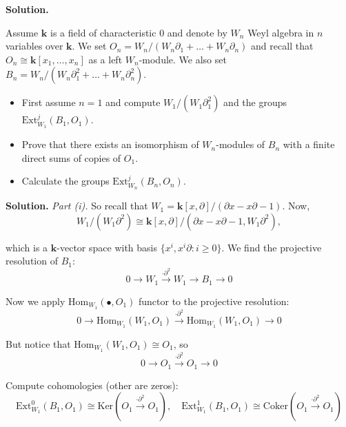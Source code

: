 \documentclass{category-template}
\begin{document}
\textbf{Solution.}

\begin{problem}
    Assume $\mathbf{k}$ is a field of characteristic $0$ and denote by $W_n$
    Weyl algebra in $n$ variables over $\mathbf{k}$. We set 
    $O_n = W_n/(W_n\partial_1 + \dots + W_n\partial_n)$ and recall that 
    $O_n \cong \mathbf{k}[x_1,\dots,x_n]$ as a left $W_n$-module. We also 
    set $B_n = W_n/(W_n\partial_1^2+\dots+W_n\partial_n^2)$.
    \begin{itemize}
        \item[(i)] First assume $n=1$ and compute $W_1/(W_1\partial_1^2)$ and 
        the groups $\text{Ext}_{W_1}^j(B_1,O_1)$.
        \item[(ii)] Prove that there exists an isomorphism of $W_n$-modules 
        of $B_n$ with a finite direct sums of copies of $O_1$.
        \item[(iii)] Calculate the groups $\text{Ext}^j_{W_n}(B_n, O_n)$.
    \end{itemize}
\end{problem}

\textbf{Solution.} \textit{Part (i).} So recall that
$W_1=\mathbf{k}[x,\partial]/(\partial x - x\partial - 1)$. Now,
\begin{equation*}
    W_1 / (W_1\partial^2) \cong \mathbf{k}[x,\partial]/(\partial x - x\partial - 1, W_1\partial^2),
\end{equation*}

which is a $\mathbf{k}$-vector space with basis $\{x^i, x^i\partial: i \geq
0\}$. We find the projective resolution of $B_1$:
\begin{equation*}
    0 \to W_1 \xrightarrow{\cdot \partial^2} W_1 \to B_1 \to 0
\end{equation*}

Now we apply $\text{Hom}_{W_1}(\bullet, O_1)$ functor to the projective resolution:
\begin{equation*}
    0 \to \text{Hom}_{W_1}(W_1, O_1) \xrightarrow{\cdot \partial^2} \text{Hom}_{W_1}(W_1, O_1) \to 0
\end{equation*}

But notice that $\text{Hom}_{W_1}(W_1, O_1) \cong O_1$, so
\begin{equation*}
    0 \to O_1 \xrightarrow{\cdot \partial^2} O_1 \to 0
\end{equation*}

Compute cohomologies (other are zeros):
\begin{equation*}
    \text{Ext}_{W_1}^0(B_1, O_1) \cong \text{Ker}(O_1 \xrightarrow{\cdot \partial^2} O_1), \quad \text{Ext}_{W_1}^1(B_1, O_1) \cong \text{Coker}(O_1 \xrightarrow{\cdot \partial^2} O_1)
\end{equation*}
\end{document}
